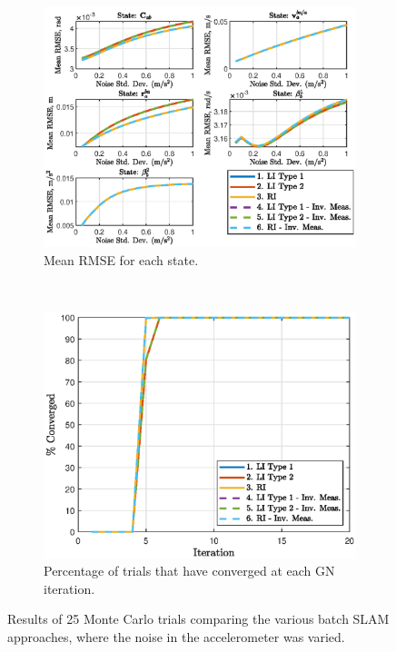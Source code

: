 \begin{figure}
	\centering
	\begin{subfigure}[b]{0.5\textwidth}
		\includegraphics[width=\textwidth]{figs/batch/accel_rmse.eps}
		\caption{Mean RMSE for each state.}
	\end{subfigure}
	~
	\begin{subfigure}[b]{0.5\textwidth}
		\includegraphics[width=\textwidth]{figs/batch/accel_perc.eps}
		\caption{Percentage of trials that have converged at each GN iteration.}
	\end{subfigure}
	\caption[Results comparing batch SLAM approaches varying zccelerometer noise.]{Results of 25 Monte Carlo trials comparing the various batch SLAM approaches, where the noise in the accelerometer was varied.}
	\label{fig:batch_accel}
\end{figure}  

